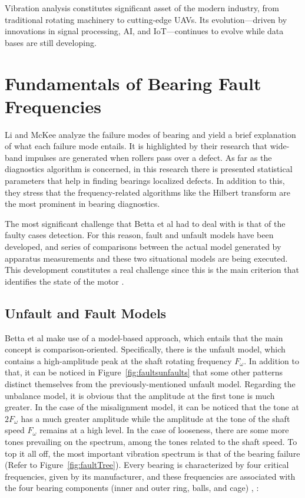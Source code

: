 {{Vibration analysis constitutes significant asset of the modern industry, from traditional rotating machinery to cutting-edge UAVs. Its evolution—driven by innovations in signal processing, AI, and IoT—continues to evolve while data bases are still developing.
}

\section{Fundamentals of Bearing Fault Frequencies}
\label{sec:faultfrequencies}
{
Li and McKee analyze the failure modes of bearing and yield a brief explanation of what each failure mode entails. It is highlighted by their research that wide-band impulses are generated when rollers pass over a defect. As far as the diagnostics algorithm is concerned, in this research there is presented statistical parameters that help in finding bearings localized defects. In addition to this, they stress that the frequency-related algorithms like the Hilbert transform are the most prominent in bearing diagnostics.

The most significant challenge that Betta et al had to deal with is that of the faulty cases detection. For this reason, fault and unfault models have been developed, and series of comparisons between the actual model generated by apparatus measurements and these two situational models are being executed. This development constitutes a real challenge since this is the main criterion that identifies the state of the motor \cite{Betta2002}.

\subsection{Unfault and Fault Models}
{
Betta et al make use of a model-based approach, which entails that the main concept is comparison-oriented. Specifically, there is the unfault model, which contains a high-amplitude peak at the shaft rotating frequency $F_{\omega}$. In addition to that, it can be noticed in Figure~\ref{fig:faultsunfaults} that some other patterns distinct themselves from the previously-mentioned unfault model. Regarding the unbalance model, it is obvious that the amplitude at the first tone is much greater. In the case of the misalignment model, it can be noticed that the tone at $2F_{\omega}$ has a much greater amplitude while the amplitude at the tone of the shaft speed $F_{\omega}$ remains at a high level. In the case of looseness, there are some more tones prevailing on the spectrum, among the tones related to the shaft speed. To top it all off, the most important vibration spectrum is that of the bearing failure (Refer to Figure~\ref{fig:faultTree}). Every bearing is characterized by four critical frequencies, given by its manufacturer, and these frequencies are associated with the four bearing components (inner and outer ring, balls, and cage) \cite{Betta2002}, \cite{Liu2025}:

}}}
